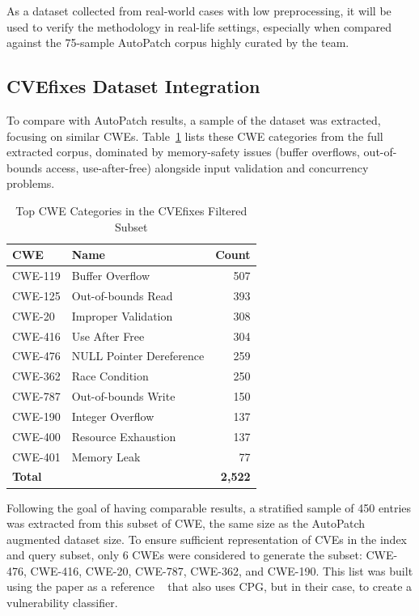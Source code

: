 As a dataset collected from real-world cases with low preprocessing, it will be used to verify the methodology in real-life settings, especially when compared against the 75-sample AutoPatch corpus highly curated by the team. 

\subsection{CVEfixes Dataset Integration}

To compare with AutoPatch results, a sample of the dataset was extracted, focusing on similar CWEs. Table~\ref{tab:cvefixes_top_cwe} lists these CWE categories from the full extracted corpus, dominated by memory-safety issues (buffer overflows, out-of-bounds access, use-after-free) alongside input validation and concurrency problems.
 
\begin{table}[htbp]
\centering
\caption{Top CWE Categories in the CVEfixes Filtered Subset}
\label{tab:cvefixes_top_cwe}
\begin{tabular}{llr}
\toprule
\textbf{CWE} & \textbf{Name} & \textbf{Count} \\
\midrule
CWE-119 & Buffer Overflow          & 507 \\
CWE-125 & Out-of-bounds Read       & 393 \\
CWE-20  & Improper Validation      & 308 \\
CWE-416 & Use After Free           & 304 \\
CWE-476 & NULL Pointer Dereference & 259 \\
CWE-362 & Race Condition           & 250 \\
CWE-787 & Out-of-bounds Write      & 150 \\
CWE-190 & Integer Overflow         & 137 \\
CWE-400 & Resource Exhaustion      & 137 \\
CWE-401 & Memory Leak              & 77  \\
\midrule
\textbf{Total} & & \textbf{2,522} \\
\bottomrule
\end{tabular}
\end{table}
 
Following the goal of having comparable results, a stratified sample of 450 entries was extracted from this subset of CWE, the same size as the AutoPatch augmented dataset size. To ensure sufficient representation of CVEs in the index and query subset, only 6 CWEs were considered to generate the subset: CWE-476, CWE-416, CWE-20, CWE-787, CWE-362, and CWE-190. This list was built using the paper as a reference ~\cite{shao2025graphfvd}
that also uses CPG, but in their case, to create a vulnerability classifier.

